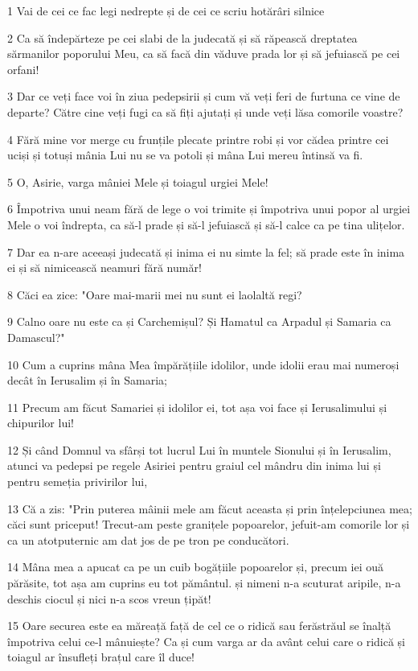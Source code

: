 \par 1 Vai de cei ce fac legi nedrepte și de cei ce scriu hotărâri silnice
\par 2 Ca să îndepărteze pe cei slabi de la judecată și să răpească dreptatea sărmanilor poporului Meu, ca să facă din văduve prada lor și să jefuiască pe cei orfani!
\par 3 Dar ce veți face voi în ziua pedepsirii și cum vă veți feri de furtuna ce vine de departe? Către cine veți fugi ca să fiți ajutați și unde veți lăsa comorile voastre?
\par 4 Fără mine vor merge cu frunțile plecate printre robi și vor cădea printre cei uciși și totuși mânia Lui nu se va potoli și mâna Lui mereu întinsă va fi.
\par 5 O, Asirie, varga mâniei Mele și toiagul urgiei Mele!
\par 6 Împotriva unui neam fără de lege o voi trimite și împotriva unui popor al urgiei Mele o voi îndrepta, ca să-l prade și să-l jefuiască și să-l calce ca pe tina ulițelor.
\par 7 Dar ea n-are aceeași judecată și inima ei nu simte la fel; să prade este în inima ei și să nimicească neamuri fără număr!
\par 8 Căci ea zice: "Oare mai-marii mei nu sunt ei laolaltă regi?
\par 9 Calno oare nu este ca și Carchemișul? Și Hamatul ca Arpadul și Samaria ca Damascul?"
\par 10 Cum a cuprins mâna Mea împărățiile idolilor, unde idolii erau mai numeroși decât în Ierusalim și în Samaria;
\par 11 Precum am făcut Samariei și idolilor ei, tot așa voi face și Ierusalimului și chipurilor lui!
\par 12 Și când Domnul va sfârși tot lucrul Lui în muntele Sionului și în Ierusalim, atunci va pedepsi pe regele Asiriei pentru graiul cel mândru din inima lui și pentru semeția privirilor lui,
\par 13 Că a zis: "Prin puterea mâinii mele am făcut aceasta și prin înțelepciunea mea; căci sunt priceput! Trecut-am peste granițele popoarelor, jefuit-am comorile lor și ca un atotputernic am dat jos de pe tron pe conducători.
\par 14 Mâna mea a apucat ca pe un cuib bogățiile popoarelor și, precum iei ouă părăsite, tot așa am cuprins eu tot pământul. și nimeni n-a scuturat aripile, n-a deschis ciocul și nici n-a scos vreun țipăt!
\par 15 Oare securea este ea măreață față de cel ce o ridică sau ferăstrăul se înalță împotriva celui ce-l mânuiește? Ca și cum varga ar da avânt celui care o ridică și toiagul ar însufleți brațul care îl duce!
